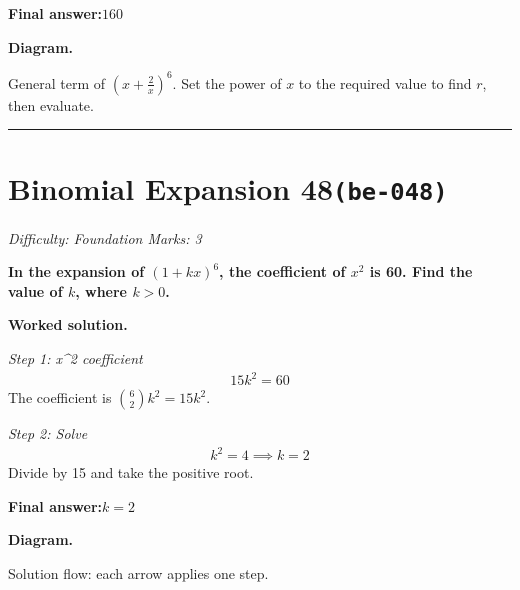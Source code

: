 \documentclass[11pt]{article}
\newcommand{\question}[1]{\par\medskip\noindent\textbf{#1}\par}
\begin{document}
\begin{answerbox}
\textbf{Final answer:}\quad \(\displaystyle 160\)
\end{answerbox}
\textbf{Diagram.}

\begin{center}
\end{center}
\small General term of $\left(x+\frac{2}{x}\right)^{6}$. Set the power of $x$ to the required value to find $r$, then evaluate.\normalsize

\medskip\hrule

\section*{Binomial Expansion 48\quad\small\texttt{(be-048)}}
\textit{Difficulty: Foundation \quad\textbar\quad Marks: 3}

\question{In the expansion of \( (1 + kx)^6 \), the coefficient of \( x^2 \) is 60. Find the value of \( k \), where \( k > 0 \).}

\textbf{Worked solution.}

\textit{Step 1: x\textasciicircum 2 coefficient}
\[\begin{gathered}
15k^2 = 60
\end{gathered}\]
The coefficient is \( \binom{6}{2} k^2 = 15k^2 \).

\textit{Step 2: Solve}
\[\begin{gathered}
k^2 = 4 \implies k = 2
\end{gathered}\]
Divide by 15 and take the positive root.

\begin{answerbox}
\textbf{Final answer:}\quad \(\displaystyle k = 2\)
\end{answerbox}
\textbf{Diagram.}

\begin{center}
\end{center}
\small Solution flow: each arrow applies one step.\normalsize
\end{document}

